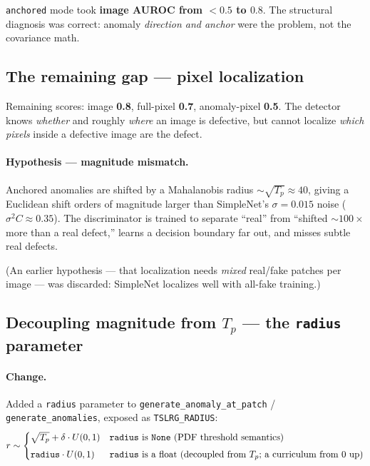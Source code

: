 \documentclass[11pt]{article}
\newcommand{\code}[1]{\texttt{#1}}
\begin{document}
\code{anchored} mode took \textbf{image AUROC from $<0.5$ to $0.8$}. The
structural diagnosis was correct: anomaly \emph{direction and anchor} were the
problem, not the covariance math.

\subsection{The remaining gap --- pixel localization}

Remaining scores: image \textbf{0.8}, full-pixel \textbf{0.7}, anomaly-pixel
\textbf{0.5}. The detector knows \emph{whether} and roughly \emph{where} an image
is defective, but cannot localize \emph{which pixels} inside a defective image are
the defect.

\paragraph{Hypothesis --- magnitude mismatch.}
Anchored anomalies are shifted by a Mahalanobis radius ${\sim}\sqrt{T_p}
\approx 40$, giving a Euclidean shift orders of magnitude larger than SimpleNet's
$\sigma = 0.015$ noise ($\sigma^2 C \approx 0.35$). The discriminator is trained
to separate ``real'' from ``shifted ${\sim}100\times$ more than a real defect,''
learns a decision boundary far out, and misses subtle real defects.

\medskip
\noindent
(An earlier hypothesis --- that localization needs \emph{mixed} real/fake patches
per image --- was discarded: SimpleNet localizes well with all-fake training.)

\subsection{Decoupling magnitude from $T_p$ --- the \code{radius} parameter}

\paragraph{Change.}
Added a \code{radius} parameter to \code{generate\_anomaly\_at\_patch} /
\code{generate\_anomalies}, exposed as \code{TSLRG\_RADIUS}:
\begin{equation}
  r \sim
  \begin{cases}
    \sqrt{T_p} + \delta \cdot U(0,1) & \text{\code{radius} is \code{None} (PDF threshold semantics)} \\[4pt]
    \code{radius} \cdot U(0,1) & \text{\code{radius} is a float (decoupled from $T_p$; a curriculum from 0 up)}
  \end{cases}
\end{equation}
\end{document}
